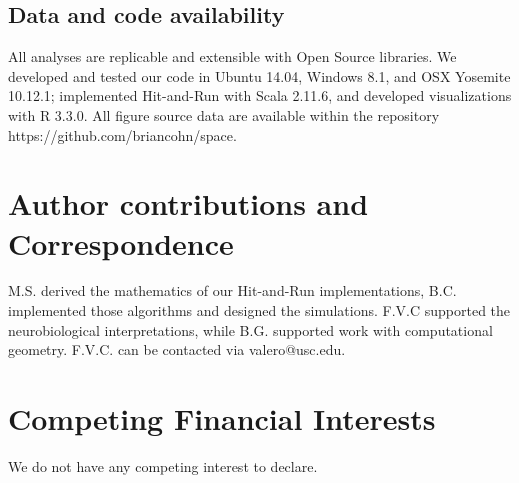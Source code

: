 \documentclass[letterpaper]{article}
\begin{document}
\subsection*{Data and code availability}
All analyses are replicable and extensible with Open Source libraries. We developed and tested our code in Ubuntu 14.04, Windows 8.1, and OSX Yosemite 10.12.1; implemented Hit-and-Run with Scala 2.11.6, and developed visualizations with R 3.3.0.
All figure source data are available within the repository https://github.com/briancohn/space.


\section*{Author contributions and Correspondence}
M.S. derived the mathematics of our Hit-and-Run implementations, B.C. implemented those algorithms and designed the simulations. F.V.C supported the neurobiological interpretations, while B.G. supported work with computational geometry. F.V.C. can be contacted via valero@usc.edu.

\section*{Competing Financial Interests}
We do not have any competing interest to declare.



% 
\end{document}
